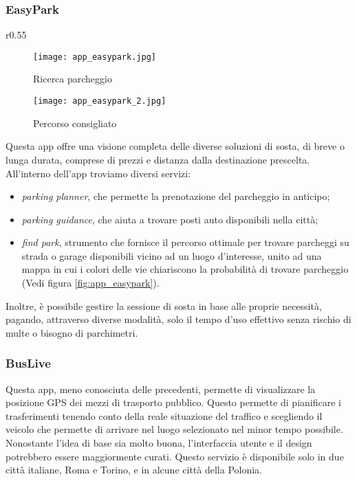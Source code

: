 \subsubsection{EasyPark}

\begin{wrapfigure}{r}{0.55\textwidth}
    \centering 
\begin{subfigure}{0.23\textwidth}
\centering
\texttt{[image: app\_easypark.jpg]}
\caption{Ricerca parcheggio}
\label{fig:app_easypark_1}
\end{subfigure}\hfil
\begin{subfigure}{0.23\textwidth}
\centering
\texttt{[image: app\_easypark\_2.jpg]}
\caption{Percorso consigliato}
\label{fig:app_easypark_2}
\end{subfigure}
\caption{
\label{fig:app_easypark}App EasyPark}
\end{wrapfigure}

Questa app offre una visione completa delle diverse soluzioni di sosta, di breve o lunga durata, comprese di prezzi e distanza dalla destinazione prescelta. All'interno dell'app troviamo diversi servizi:
\begin{itemize}
    \item \textit{parking planner}, che permette la prenotazione del parcheggio in anticipo;
    \item \textit{parking guidance}, che aiuta a trovare posti auto disponibili nella città;
    \item  \textit{find park}, strumento che fornisce il percorso ottimale per trovare parcheggi su strada o garage disponibili vicino ad un luogo d'interesse, unito ad una mappa in cui i colori delle vie chiariscono la probabilità di trovare parcheggio (Vedi figura \ref{fig:app_easypark}).
\end{itemize} 


\noindent Inoltre, è possibile gestire la sessione di sosta in base alle proprie necessità, pagando, attraverso diverse modalità, solo il tempo d'uso effettivo senza rischio di multe o bisogno di parchimetri. 

\subsubsection{BusLive}

Questa app, meno conosciuta delle precedenti, permette di visualizzare la posizione GPS dei mezzi di trasporto pubblico. Questo permette di pianificare i trasferimenti tenendo conto della reale situazione del traffico e scegliendo il veicolo che permette di arrivare nel luogo selezionato nel minor tempo possibile.
Nonostante l'idea di base sia molto buona, l'interfaccia utente e il design potrebbero essere maggiormente curati. 
Questo servizio è disponibile solo in due città italiane, Roma e Torino, e in alcune città della Polonia.

